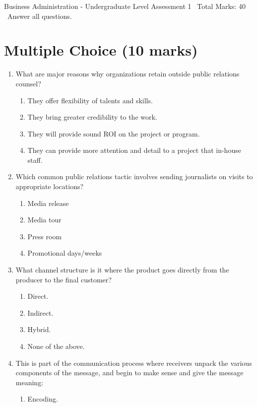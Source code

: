 \documentclass[12pt]{article}
\begin{document}
\begin{center}
Business Administration - Undergraduate Level Assessment 1 \
Total Marks: 40 \
Answer all questions.
\end{center}

\section*{Multiple Choice (10 marks)}
\begin{enumerate}[label=\arabic*.]
\item What are major reasons why organizations retain outside public relations counsel?
\begin{enumerate}[label=(\alph*)]
    \item They offer flexibility of talents and skills.
    \item They bring greater credibility to the work.
    \item They will provide sound ROI on the project or program.
    \item They can provide more attention and detail to a project that in-house staff.
\end{enumerate}
\item Which common public relations tactic involves sending journalists on visits to appropriate locations?
\begin{enumerate}[label=(\alph*)]
    \item Media release
    \item Media tour
    \item Press room
    \item Promotional days/weeks
\end{enumerate}
\item What channel structure is it where the product goes directly from the producer to the final customer?
\begin{enumerate}[label=(\alph*)]
    \item Direct.
    \item Indirect.
    \item Hybrid.
    \item None of the above.
\end{enumerate}
\item This is part of the communication process where receivers unpack the various components of the message, and begin to make sense and give the message meaning:
\begin{enumerate}[label=(\alph*)]
    \item Encoding.

\end{enumerate}
\end{enumerate}
\end{document}
